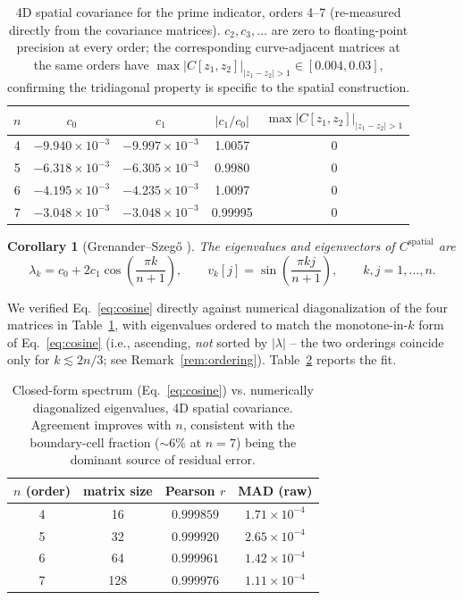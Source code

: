 \documentclass[11pt,a4paper]{article}
\newtheorem{corollary}{Corollary}
\begin{document}
\begin{table}[h]
\centering
\begin{tabular}{ccccc}
\toprule
$n$ & $c_0$ & $c_1$ & $|c_1/c_0|$ & $\max|C[z_1,z_2]|_{|z_1-z_2|>1}$\\
\midrule
4 & $-9.940\times10^{-3}$ & $-9.997\times10^{-3}$ & 1.0057 & $0$ \\
5 & $-6.318\times10^{-3}$ & $-6.305\times10^{-3}$ & 0.9980 & $0$ \\
6 & $-4.195\times10^{-3}$ & $-4.235\times10^{-3}$ & 1.0097 & $0$ \\
7 & $-3.048\times10^{-3}$ & $-3.048\times10^{-3}$ & 0.99995 & $0$ \\
\bottomrule
\end{tabular}
\caption{4D spatial covariance for the prime indicator, orders 4--7
(re-measured directly from the covariance matrices). $c_2,c_3,\ldots$ are
zero to floating-point precision at every order; the corresponding
curve-adjacent matrices at the same orders have $\max|C[z_1,z_2]|_{|z_1-z_2|>1}
\in [0.004,0.03]$, confirming the tridiagonal property is specific to the
spatial construction.}
\label{tab:tridiag-verify}
\end{table}

\begin{corollary}[Grenander--Szeg\H{o} \cite{grenander1958}]
\label{cor:eigenvalues}
The eigenvalues and eigenvectors of $C^{\mathrm{spatial}}$ are
\begin{equation}
\lambda_k = c_0 + 2c_1\cos\!\left(\frac{\pi k}{n+1}\right), \qquad
v_k[j] = \sin\!\left(\frac{\pi k j}{n+1}\right), \qquad k,j=1,\ldots,n.
\label{eq:cosine}
\end{equation}
\end{corollary}

We verified Eq.~\eqref{eq:cosine} directly against numerical
diagonalization of the four matrices in Table~\ref{tab:tridiag-verify}, with
eigenvalues ordered to match the monotone-in-$k$ form of
Eq.~\eqref{eq:cosine} (i.e., ascending, \emph{not} sorted by $|\lambda|$ --
the two orderings coincide only for $k \lesssim 2n/3$; see
Remark~\ref{rem:ordering}). Table~\ref{tab:analytic-fit} reports the fit.

\begin{table}[h]
\centering
\begin{tabular}{cccc}
\toprule
$n$ (order) & matrix size & Pearson $r$ & MAD (raw) \\
\midrule
4 & 16  & $0.999859$ & $1.71\times10^{-4}$ \\
5 & 32  & $0.999920$ & $2.65\times10^{-4}$ \\
6 & 64  & $0.999961$ & $1.42\times10^{-4}$ \\
7 & 128 & $0.999976$ & $1.11\times10^{-4}$ \\
\bottomrule
\end{tabular}
\caption{Closed-form spectrum (Eq.~\ref{eq:cosine}) vs. numerically
diagonalized eigenvalues, 4D spatial covariance. Agreement improves with
$n$, consistent with the boundary-cell fraction ($\sim 6\%$ at $n=7$)
being the dominant source of residual error.}
\label{tab:analytic-fit}
\end{table}
\end{document}
